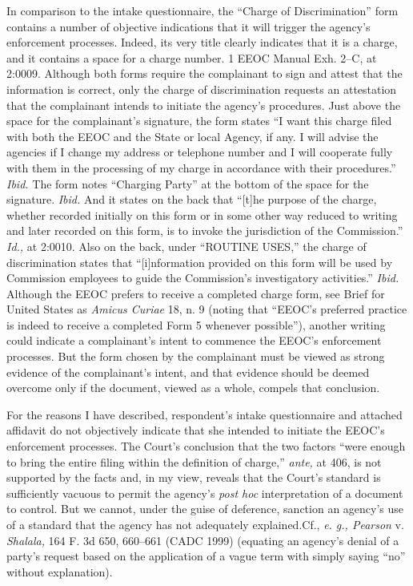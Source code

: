   In comparison to the intake questionnaire, the ``Charge of
Discrimination'' form contains a number of objective indications that
it will trigger the agency's enforcement processes. Indeed, its very
title clearly indicates that it is a charge, and it contains a space for
a charge number. 1 EEOC Manual Exh. 2--C, at 2:0009. Although both
forms require the complainant to sign and attest that the information
is correct, only the charge of discrimination requests an attestation
that the complainant intends to initiate the agency's procedures.
Just above the space for the complainant's signature, the form states
``I want this charge filed with both the EEOC and the State or local
Agency, if any. I will advise the agencies if I change my address or
telephone number and I will cooperate fully with them in the processing
of my charge in accordance with their procedures.'' \emph{Ibid.} The
form notes ``Charging Party'' at the bottom of the space for the
signature. \emph{Ibid.} And it states on the back that ``[t]he purpose
of the charge, whether recorded initially on this form or in some other
way reduced to writing and later recorded on this form, is to invoke
the jurisdiction of the Commission.'' \emph{Id.,} at 2:0010. Also on
the back, under ``ROUTINE USES,'' the charge of discrimination states
that ``[i]nformation provided on this form will be used by Commission
employees to guide the Commission's investigatory activities.''
\emph{Ibid.} Although the EEOC prefers to receive a completed charge
form, see Brief for United States as \emph{Amicus Curiae} 18, n. 9
\newpage  (noting that ``EEOC's preferred practice is indeed to receive
a completed Form 5 whenever possible''), another writing could
indicate a complainant's intent to commence the EEOC's enforcement
processes. But the form chosen by the complainant must be viewed as
strong evidence of the complainant's intent, and that evidence should
be deemed overcome only if the document, viewed as a whole, compels that
conclusion.

  For the reasons I have described, respondent's intake questionnaire
and attached affidavit do not objectively indicate that she intended to
initiate the EEOC's enforcement processes. The Court's conclusion
that the two factors ``were enough to bring the entire filing
within the definition of charge,'' \emph{ante,} at 406, is not
supported by the facts and, in my view, reveals that the Court's
standard is sufficiently vacuous to permit the agency's \emph{post hoc}
interpretation of a document to control. But we cannot, under the guise
of deference, sanction an agency's use of a standard that the agency
has not adequately explained.Cf., \emph{e. g., Pearson} v. \emph{Shalala,}
164 F. 3d 650, 660--661 (CADC 1999) (equating an agency's denial of a
party's request based on the application of a vague term with simply
saying ``no'' without explanation).

